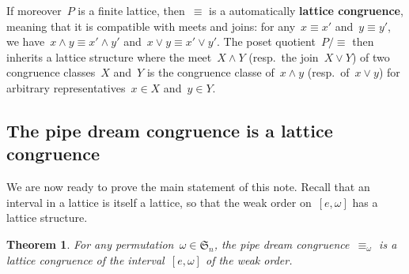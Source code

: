 \documentclass{amsart}
\newtheorem{theorem}{Theorem}[section]
\theoremstyle{definition}
\newcommand{\defn}[1]{\textbf{\textsf{\color{PineGreen} #1}}} %
\newcommand{\fS}{\mathfrak{S}} %
\newcommand{\meet}{\wedge} %
\newcommand{\join}{\vee} %
\begin{document}
If moreover~$P$ is a finite lattice, then~$\equiv$ is a automatically \defn{lattice congruence}, meaning that it is compatible with meets and joins: for any~$x \equiv x'$ and~$y \equiv y'$, we have~$x \meet y \equiv x' \meet y'$ and~$x \join y \equiv x' \join y'$. The poset quotient~$P/{\equiv}$ then inherits a lattice structure where the meet~$X \meet Y$ (resp.~the join~$X \join Y$) of two congruence classes~$X$ and~$Y$ is the congruence classe of~$x \meet y$ (resp.~of~$x \join y$) for arbitrary representatives~$x \in X$ and~$y \in Y$.



\subsection{The pipe dream congruence is a lattice congruence}
\label{subsec:proofCongruence}

We are now ready to prove the main statement of this note. Recall that an interval in a lattice is itself a lattice, so that the weak order on~$[e,\omega]$ has a lattice structure.

\begin{theorem}\label{thm_pipe_latticecongruence}
For any permutation~$\omega \in \fS_n$, the pipe dream congruence~$\equiv_\omega$ is a lattice congruence of the interval~$[e,\omega]$ of the weak order.
\end{theorem}
\end{document}
